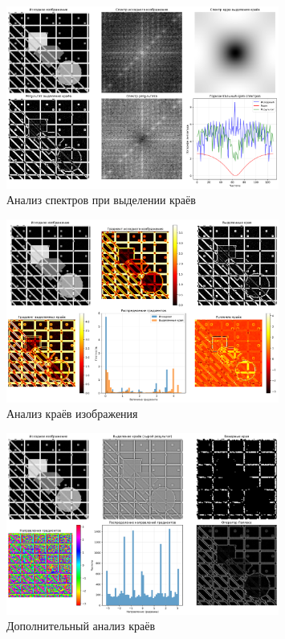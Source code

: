 \begin{figure}[H]
    \centering
    \includegraphics[width=0.8\textwidth]{images/task4/spectrum_analysis.png}
    \caption{Анализ спектров при выделении краёв}
    \label{fig:spectrum_analysis_edge}
\end{figure}

\begin{figure}[H]
    \centering
    \includegraphics[width=0.8\textwidth]{images/task4/edge_analysis.png}
    \caption{Анализ краёв изображения}
    \label{fig:edge_analysis}
\end{figure}

\begin{figure}[H]
    \centering
    \includegraphics[width=0.8\textwidth]{images/task4/additional_edge_analysis.png}
    \caption{Дополнительный анализ краёв}
    \label{fig:additional_edge_analysis}
\end{figure}

